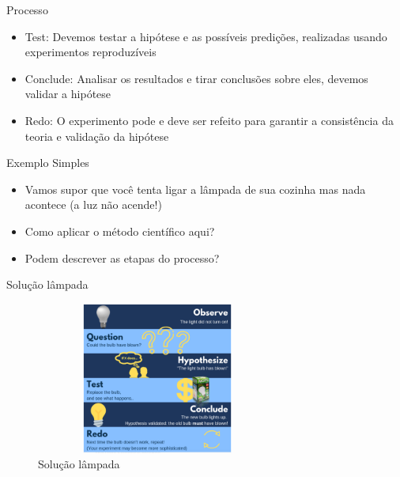 \begin{frame}
	\begin{block}{Processo}
		  \begin{itemize}

			  \item  Test: Devemos testar a hipótese e as possíveis predições, realizadas usando experimentos reproduzíveis

			  \item  Conclude: Analisar os resultados e tirar conclusões sobre eles, devemos validar a hipótese

			  \item  Redo: O experimento pode e deve ser refeito para garantir a consistência da teoria e validação da hipótese

		  \end{itemize}
	\end{block}
\end{frame}


\begin{frame}
	\begin{block}{Exemplo Simples}
		  \begin{itemize}

			  \item  Vamos supor que você tenta ligar a lâmpada de sua cozinha mas nada acontece (a luz não acende!)
			  
			  \item Como aplicar o método científico aqui?
			  
			  \item Podem descrever as etapas do processo?

		  \end{itemize}
	\end{block}
\end{frame}


\begin{frame}
	\begin{block}{Solução lâmpada}
		\begin{figure}[!htb]
			\centering	  				
			\includegraphics[height=5cm, width = 8cm]{./pic/exemploLampada.png}
			\caption{Solução lâmpada}
		\end{figure}
	\end{block}
\end{frame}



